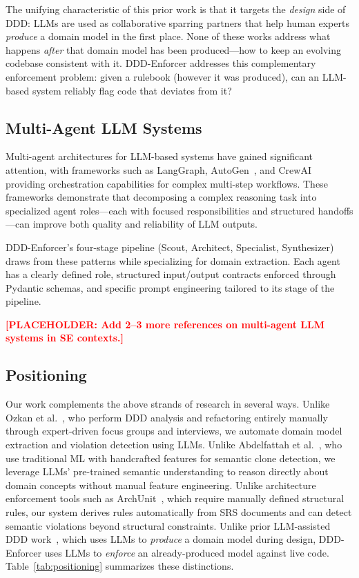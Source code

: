 \documentclass[smallextended]{svjour3}
\newcommand{\placeholder}[1]{\textcolor{red}{\textbf{[PLACEHOLDER: #1]}}}
\begin{document}
The unifying characteristic of this prior work is that it targets the \emph{design} side of DDD: LLMs are used as collaborative sparring partners that help human experts \emph{produce} a domain model in the first place.
None of these works address what happens \emph{after} that domain model has been produced---how to keep an evolving codebase consistent with it.
DDD-Enforcer addresses this complementary enforcement problem: given a rulebook (however it was produced), can an LLM-based system reliably flag code that deviates from it?

\subsection{Multi-Agent LLM Systems}
\label{sec:bg_multiagent}

Multi-agent architectures for LLM-based systems have gained significant attention, with frameworks such as LangGraph, AutoGen~\cite{wu2023autogen}, and CrewAI providing orchestration capabilities for complex multi-step workflows.
These frameworks demonstrate that decomposing a complex reasoning task into specialized agent roles---each with focused responsibilities and structured handoffs---can improve both quality and reliability of LLM outputs.

DDD-Enforcer's four-stage pipeline (Scout, Architect, Specialist, Synthesizer) draws from these patterns while specializing for domain extraction.
Each agent has a clearly defined role, structured input/output contracts enforced through Pydantic schemas, and specific prompt engineering tailored to its stage of the pipeline.

\placeholder{Add 2--3 more references on multi-agent LLM systems in SE contexts.}

\subsection{Positioning}
\label{sec:bg_positioning}

Our work complements the above strands of research in several ways.
Unlike Ozkan et al.~\cite{ozkan2023refactoring}, who perform DDD analysis and refactoring entirely manually through expert-driven focus groups and interviews, we automate domain model extraction and violation detection using LLMs.
Unlike Abdelfattah et al.~\cite{abdelfattah2023semantic}, who use traditional ML with handcrafted features for semantic clone detection, we leverage LLMs' pre-trained semantic understanding to reason directly about domain concepts without manual feature engineering.
Unlike architecture enforcement tools such as ArchUnit~\cite{archunit2024}, which require manually defined structural rules, our system derives rules automatically from SRS documents and can detect semantic violations beyond structural constraints.
Unlike prior LLM-assisted DDD work~\cite{automatingddd2024,evans2024infoq}, which uses LLMs to \emph{produce} a domain model during design, DDD-Enforcer uses LLMs to \emph{enforce} an already-produced model against live code.
Table~\ref{tab:positioning} summarizes these distinctions.
\end{document}
